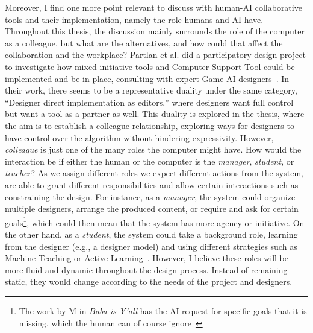 Moreover, I find one more point relevant to discuss with human-AI collaborative tools and their implementation, namely the role humans and AI have. Throughout this thesis, the discussion mainly surrounds the role of the computer as a colleague, but what are the alternatives, and how could that affect the collaboration and the workplace? Partlan et al. did a participatory design project to investigate how mixed-initiative tools and Computer Support Tool could be implemented and be in place, consulting with expert Game AI designers~\cite{partlan_design-driven_2021}. In their work, there seems to be a representative duality under the same category, ``Designer direct implementation as editors,'' where designers want full control but want a tool as a partner as well. This duality is explored in the thesis, where the aim is to establish a colleague relationship, exploring ways for designers to have control over the algorithm without hindering expressivity. However, \emph{colleague} is just one of the many roles the computer might have. How would the interaction be if either the human or the computer is the \emph{manager}, \emph{student}, or \emph{teacher}? As we assign different roles we expect different actions from the system, are able to grant different responsibilities and allow certain interactions such as constraining the design. For instance, as a \emph{manager}, the system could organize multiple designers, arrange the produced content, or require and ask for certain goals\footnote{The work by M in \emph{Baba is Y'all} has the AI request for specific goals that it is missing, which the human can of course ignore~\cite{charity_baba_2022}}, which could then mean that the system has more agency or initiative. On the other hand, as a \emph{student}, the system could take a background role, learning from the designer (e.g., a designer model) and using different strategies such as Machine Teaching or Active Learning~\cite{tegen_taxonomy_2021}. However, I believe these roles will be more fluid and dynamic throughout the design process. Instead of remaining static, they would change according to the needs of the project and designers.




